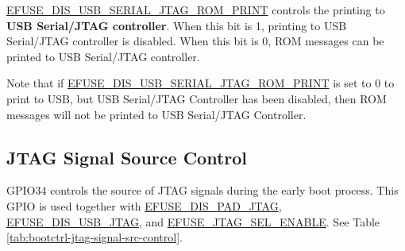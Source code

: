 \documentclass[main\_\_EN.tex]{subfiles}
\begin{document}
\hyperref[fielddesc:EFUSEDISUSBSERIALJTAGROMPRINT]{EFUSE\_DIS\_USB\_SERIAL\_JTAG\_ROM\_PRINT} controls the printing to \textbf{USB Serial/JTAG controller}. When this bit is 1, printing to USB Serial/JTAG controller is disabled. When this bit is 0, ROM messages can be printed to USB Serial/JTAG controller.

Note that if \hyperref[fielddesc:EFUSEDISUSBSERIALJTAGROMPRINT]{EFUSE\_DIS\_USB\_SERIAL\_JTAG\_ROM\_PRINT} is set to 0 to print to USB, but USB Serial/JTAG Controller has been disabled, then ROM messages will not be printed to USB Serial/JTAG Controller.

\subsection{JTAG Signal Source Control}

GPIO34 controls the source of JTAG signals during the early boot process. This GPIO is used together with \hyperref[fielddesc:EFUSEDISPADJTAG]{EFUSE\_DIS\_PAD\_JTAG}, \hyperref[fielddesc:EFUSEDISUSBJTAG]{EFUSE\_DIS\_USB\_JTAG}, and \hyperref[fielddesc:EFUSEJTAGSELENABLE]{EFUSE\_JTAG\_SEL\_ENABLE}. See Table \ref{tab:bootctrl-jtag-signal-src-control}.
\end{document}
